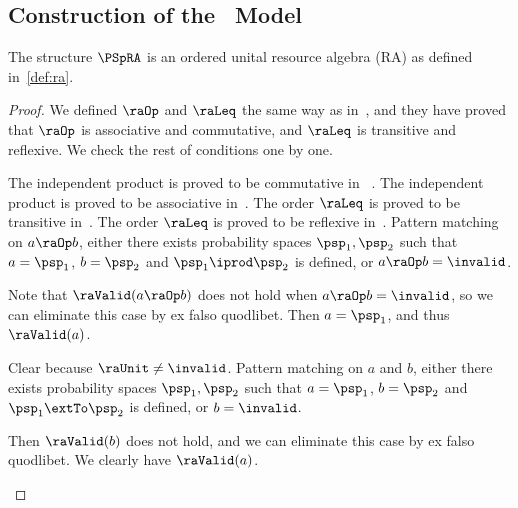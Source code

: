 \documentclass[acmsmall,nonacm,screen,appendix]{acmart}
\begin{document}
\subsection{Construction of the \thelogic\ Model}

\begin{lemma}
  The structure $\PSpRA$ is an ordered unital resource algebra (RA) as defined
  in~\cref{def:ra}.
\end{lemma}

\begin{proof}
We defined $\raOp$ and $\raLeq$ the same way as in~\cite{lilac},
  and they have proved that $\raOp$ is associative and commutative,
  and $\raLeq$ is transitive and reflexive.
  We check the rest of conditions one by one.
  \begin{induction}
    \step[Condition~$a \raOp b = b \raOp a$]
      The independent product is proved to be commutative in ~\cite{lilac}.
    \step[Condition~$(a \raOp b) \raOp c = a \raOp (b \raOp c)$]
      The independent product is proved to be associative in~\cite{lilac}.
      The order $\raLeq$ is proved to be transitive in~\cite{lilac}.
      The order $\raLeq$ is proved to be reflexive in~\cite{lilac}.
      Pattern matching on $a \raOp b$,
      either there exists probability spaces $\psp_1, \psp_2$ such that
      $a = \psp_1$, $b = \psp_2$ and $\psp_1 \iprod \psp_2$ is defined,
      or $a \raOp b = \invalid$.
\begin{casesplit}
        \case[$a \raOp b = \invalid$] Note that
        $\raValid(a \raOp b)$ does not hold when $a \raOp b = \invalid$,
      so we can eliminate this case by ex falso quodlibet.
      \case[$a \raOp b = \psp_1 \iprod \psp_2$] Then
      $a = \psp_1$, and thus $\raValid(a)$.
      \end{casesplit}

      Clear because $\raUnit \neq \invalid$.
      Pattern matching on $a$ and $b$,
      either there exists probability spaces $\psp_1, \psp_2$ such that
      $a = \psp_1$, $b = \psp_2$ and $\psp_1 \extTo \psp_2$ is defined,
      or $b = \invalid$.
      \begin{casesplit}
        \case[$b = \invalid$] Then $\raValid(b)$ does not hold,
      and we can eliminate this case by ex falso quodlibet.
        \case[$a = \psp_1$, $b = \psp_2$ and
        $\psp_1 \extTo \psp_2$]  We clearly have $\raValid(a)$.
      \end{casesplit}


\end{induction}
\end{proof}
\end{document}
